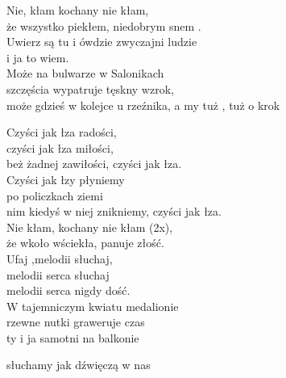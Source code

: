 \begin{text}
    Nie, kłam kochany nie kłam,\\
    że wszystko piekłem, niedobrym snem .\\
    Uwierz są tu i ówdzie zwyczajni ludzie\\
    i ja to wiem.\\
    Może na bulwarze w Salonikach\\
    szczęścia wypatruje tęskny wzrok,\\
    może gdzieś w kolejce u rzeźnika, a my tuż , tuż o krok

    Czyści jak łza radości,\\
    czyści jak łza miłości,\\
    beż żadnej zawiłości, czyści jak łza.\\
    Czyści jak łzy płyniemy\\
    po policzkach ziemi\\
    nim kiedyś w niej znikniemy, czyści jak łza.\\

    Nie kłam, kochany nie kłam (2x),\\
    że wkoło wściekła, panuje złość.\\
    Ufaj ,melodii słuchaj,\\
    melodii serca słuchaj\\
    melodii serca nigdy dość.\\
    W tajemniczym kwiatu medalionie\\
    rzewne nutki graweruje czas\\
    ty i ja samotni na balkonie

    słuchamy jak dźwięczą w nas
\end{text}
\begin{chord}

\end{chord}